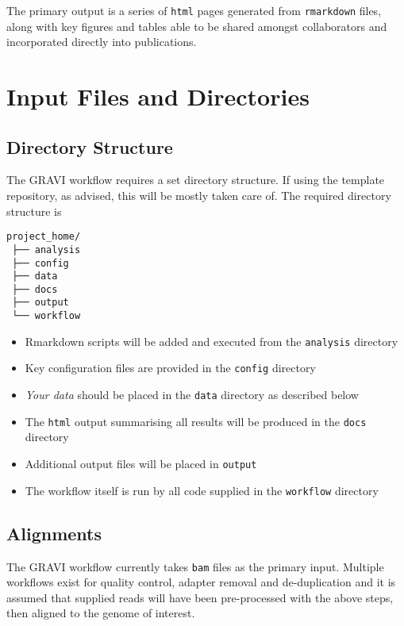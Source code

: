 \documentclass[
]{book}
\providecommand{\tightlist}{%
  \setlength{\itemsep}{0pt}\setlength{\parskip}{0pt}}
\begin{document}
The primary output is a series of \texttt{html} pages generated from \texttt{rmarkdown} files, along with key figures and tables able to be shared amongst collaborators and incorporated directly into publications.

\hypertarget{input-files}{%
\chapter{Input Files and Directories}\label{input-files}}

\hypertarget{directories}{%
\section{Directory Structure}\label{directories}}

The GRAVI workflow requires a set directory structure.
If using the template repository, as advised, this will be mostly taken care of.
The required directory structure is

\begin{verbatim}
project_home/
 ├── analysis
 ├── config
 ├── data
 ├── docs
 ├── output
 └── workflow
\end{verbatim}

\begin{itemize}
\tightlist
\item
  Rmarkdown scripts will be added and executed from the \texttt{analysis} directory
\item
  Key configuration files are provided in the \texttt{config} directory
\item
  \emph{Your data} should be placed in the \texttt{data} directory as described below
\item
  The \texttt{html} output summarising all results will be produced in the \texttt{docs} directory
\item
  Additional output files will be placed in \texttt{output}
\item
  The workflow itself is run by all code supplied in the \texttt{workflow} directory
\end{itemize}

\hypertarget{alignments}{%
\section{Alignments}\label{alignments}}

The GRAVI workflow currently takes \texttt{bam} files as the primary input.
Multiple workflows exist for quality control, adapter removal and de-duplication and it is assumed that supplied reads will have been pre-processed with the above steps, then aligned to the genome of interest.
\end{document}
